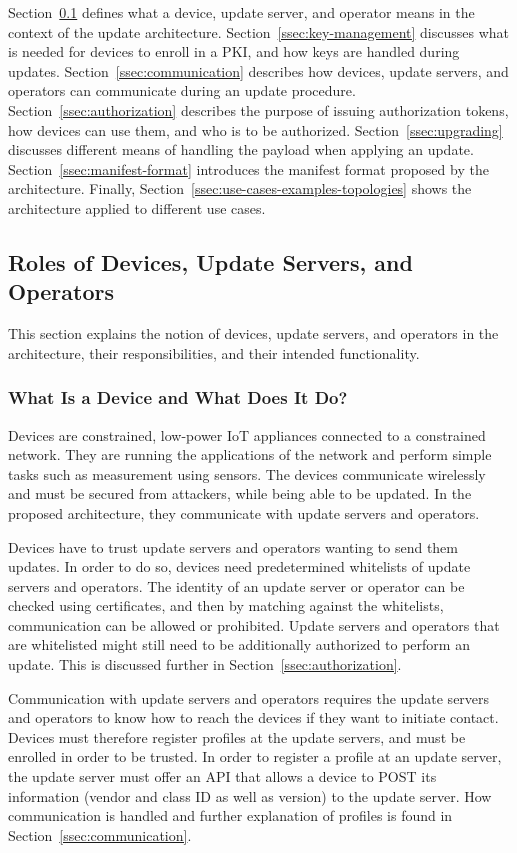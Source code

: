 \documentclass[0-thesis.tex]{subfiles}
\begin{document}
Section~\ref{ssec:roles} defines what a device, update server, and operator means in the
context of the update architecture. Section~\ref{ssec:key-management} discusses what is
needed for devices to enroll in a PKI, and how keys are handled during updates.
Section~\ref{ssec:communication} describes how devices, update servers, and operators can
communicate during an update procedure. Section~\ref{ssec:authorization} describes the
purpose of issuing authorization tokens, how devices can use them, and who is to be
authorized. Section~\ref{ssec:upgrading} discusses different means of handling the payload
when applying an update. Section~\ref{ssec:manifest-format} introduces the manifest format
proposed by the architecture. Finally, Section~\ref{ssec:use-cases-examples-topologies}
shows the architecture applied to different use cases.

\subsection{Roles of Devices, Update Servers, and Operators}
\label{ssec:roles}
This section explains the notion of devices, update servers, and operators in the
architecture, their responsibilities, and their intended functionality.

\subsubsection{What Is a Device and What Does It Do?}
\label{sssec:what-is-a-device}
Devices are constrained, low-power IoT appliances connected to a constrained network. They
are running the applications of the network and perform simple tasks such as measurement
using sensors. The devices communicate wirelessly and must be secured from attackers, while
being able to be updated. In the proposed architecture, they communicate with update
servers and operators.

Devices have to trust update servers and operators wanting to send them updates. In order
to do so, devices need predetermined whitelists of update servers and operators. The
identity of an update server or operator can be checked using certificates, and then by
matching against the whitelists, communication can be allowed or prohibited. Update
servers and operators that are whitelisted might still need to be additionally authorized
to perform an update. This is discussed further in Section~\ref{ssec:authorization}.

Communication with update servers and operators requires the update servers and operators
to know how to reach the devices if they want to initiate contact. Devices must therefore
register profiles at the update servers, and must be enrolled in order to be trusted. In
order to register a profile at an update server, the update server must offer an API that
allows a device to POST its information (vendor and class ID as well as version) to the
update server. How communication is handled and further explanation of profiles is found
in Section~\ref{ssec:communication}.
\end{document}
